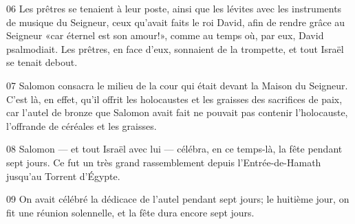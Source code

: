 
06 Les prêtres se tenaient à leur poste, ainsi que les lévites avec les instruments de musique du Seigneur, ceux qu’avait faits le roi David, afin de rendre grâce au Seigneur «car éternel est son amour!», comme au temps où, par eux, David psalmodiait. Les prêtres, en face d’eux, sonnaient de la trompette, et tout Israël se tenait debout.

07 Salomon consacra le milieu de la cour qui était devant la Maison du Seigneur. C’est là, en effet, qu’il offrit les holocaustes et les graisses des sacrifices de paix, car l’autel de bronze que Salomon avait fait ne pouvait pas contenir l’holocauste, l’offrande de céréales et les graisses.

08 Salomon --- et tout Israël avec lui --- célébra, en ce temps-là, la fête pendant sept jours. Ce fut un très grand rassemblement depuis l’Entrée-de-Hamath jusqu’au Torrent d’Égypte.

09 On avait célébré la dédicace de l’autel pendant sept jours; le huitième jour, on fit une réunion solennelle, et la fête dura encore sept jours.
